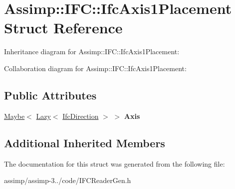 \hypertarget{struct_assimp_1_1_i_f_c_1_1_ifc_axis1_placement}{\section{Assimp\+:\+:I\+F\+C\+:\+:Ifc\+Axis1\+Placement Struct Reference}
\label{struct_assimp_1_1_i_f_c_1_1_ifc_axis1_placement}
}


Inheritance diagram for Assimp\+:\+:I\+F\+C\+:\+:Ifc\+Axis1\+Placement\+:


Collaboration diagram for Assimp\+:\+:I\+F\+C\+:\+:Ifc\+Axis1\+Placement\+:
\subsection*{Public Attributes}
\begin{DoxyCompactItemize}
\item 
\hypertarget{struct_assimp_1_1_i_f_c_1_1_ifc_axis1_placement_a2431e1817e301fa43a72cb12e8fe9d06}{\hyperlink{struct_assimp_1_1_s_t_e_p_1_1_maybe}{Maybe}$<$ \hyperlink{struct_assimp_1_1_s_t_e_p_1_1_lazy}{Lazy}$<$ \hyperlink{struct_assimp_1_1_i_f_c_1_1_ifc_direction}{Ifc\+Direction} $>$ $>$ {\bfseries Axis}}\label{struct_assimp_1_1_i_f_c_1_1_ifc_axis1_placement_a2431e1817e301fa43a72cb12e8fe9d06}

\end{DoxyCompactItemize}
\subsection*{Additional Inherited Members}


The documentation for this struct was generated from the following file\+:\begin{DoxyCompactItemize}
\item 
assimp/assimp-\/3../code/I\+F\+C\+Reader\+Gen.\+h\end{DoxyCompactItemize}

